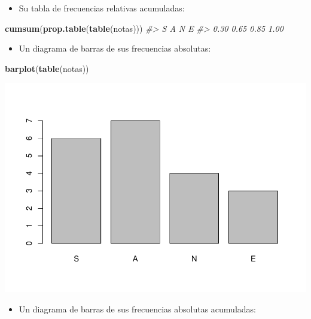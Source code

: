 \documentclass[
]{book}
\newenvironment{Shaded}{\begin{snugshade}}{\end{snugshade}}
\newcommand{\CommentTok}[1]{\textcolor[rgb]{0.56,0.35,0.01}{\textit{#1}}}
\newcommand{\KeywordTok}[1]{\textcolor[rgb]{0.13,0.29,0.53}{\textbf{#1}}}
\newcommand{\NormalTok}[1]{#1}
\providecommand{\tightlist}{%
  \setlength{\itemsep}{0pt}\setlength{\parskip}{0pt}}
\theoremstyle{definition}
\theoremstyle{definition}
\theoremstyle{definition}
\theoremstyle{remark}
\begin{document}
\begin{itemize}
\tightlist
\item
  Su tabla de frecuencias relativas acumuladas:
\end{itemize}

\begin{Shaded}
\begin{Highlighting}[]
\KeywordTok{cumsum}\NormalTok{(}\KeywordTok{prop.table}\NormalTok{(}\KeywordTok{table}\NormalTok{(notas)))}
\CommentTok{\#\textgreater{}    S    A    N    E }
\CommentTok{\#\textgreater{} 0.30 0.65 0.85 1.00}
\end{Highlighting}
\end{Shaded}

\begin{itemize}
\tightlist
\item
  Un diagrama de barras de sus frecuencias absolutas:
\end{itemize}

\begin{Shaded}
\begin{Highlighting}[]
\KeywordTok{barplot}\NormalTok{(}\KeywordTok{table}\NormalTok{(notas))}
\end{Highlighting}
\end{Shaded}

\begin{center}\includegraphics[width=0.9\linewidth]{11chap11_Descripcion_ordinales_files/figure-latex/unnamed-chunk-5-1} \end{center}

\begin{itemize}
\tightlist
\item
  Un diagrama de barras de sus frecuencias absolutas acumuladas:
\end{itemize}
\end{document}
